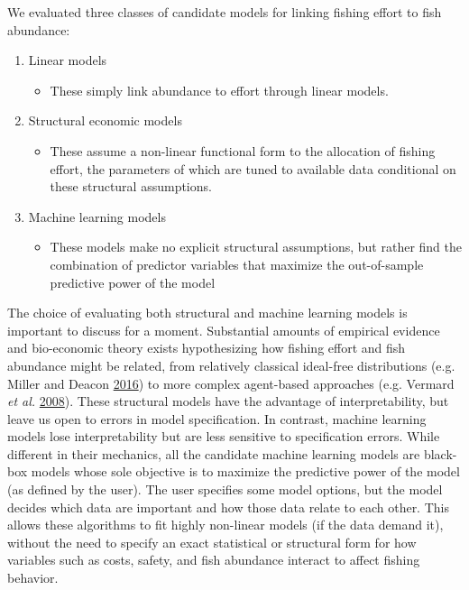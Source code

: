 \documentclass[twoside,12pt,final]{ucthesis-CA2012}
\providecommand{\tightlist}{%
  \setlength{\itemsep}{0pt}\setlength{\parskip}{0pt}}
\begin{document}
\begin{ucmainmatter}
We evaluated three classes of candidate models for linking fishing
effort to fish abundance:
\begin{enumerate}
\def\labelenumi{\arabic{enumi}.}
\tightlist
\item
  Linear models
  \begin{itemize}
  \tightlist
  \item
    These simply link abundance to effort through linear models.
  \end{itemize}
\item
  Structural economic models
  \begin{itemize}
  \tightlist
  \item
    These assume a non-linear functional form to the allocation of
    fishing effort, the parameters of which are tuned to available data
    conditional on these structural assumptions.
  \end{itemize}
\item
  Machine learning models
  \begin{itemize}
  \tightlist
  \item
    These models make no explicit structural assumptions, but rather
    find the combination of predictor variables that maximize the
    out-of-sample predictive power of the model
  \end{itemize}
\end{enumerate}
The choice of evaluating both structural and machine learning models is
important to discuss for a moment. Substantial amounts of empirical
evidence and bio-economic theory exists hypothesizing how fishing effort
and fish abundance might be related, from relatively classical
ideal-free distributions (e.g. Miller and Deacon
\protect\hyperlink{ref-Miller2016}{2016}) to more complex agent-based
approaches (e.g. Vermard \emph{et al.}
\protect\hyperlink{ref-Vermard2008}{2008}). These structural models have
the advantage of interpretability, but leave us open to errors in model
specification. In contrast, machine learning models lose
interpretability but are less sensitive to specification errors. While
different in their mechanics, all the candidate machine learning models
are black-box models whose sole objective is to maximize the predictive
power of the model (as defined by the user). The user specifies some
model options, but the model decides which data are important and how
those data relate to each other. This allows these algorithms to fit
highly non-linear models (if the data demand it), without the need to
specify an exact statistical or structural form for how variables such
as costs, safety, and fish abundance interact to affect fishing
behavior.


\end{ucmainmatter}
\end{document}
